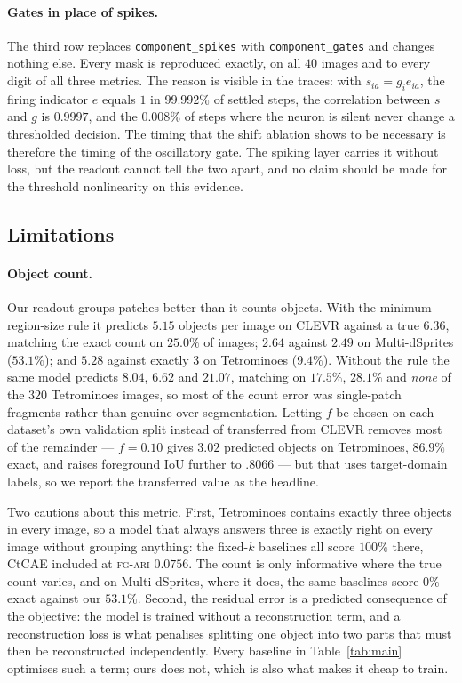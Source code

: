 \paragraph{Gates in place of spikes.}
The third row replaces \texttt{component\_spikes} with \texttt{component\_gates} and changes
nothing else. Every mask is reproduced exactly, on all $40$ images and to every digit of all
three metrics. The reason is visible in the traces: with $s_{ia}=g_ie_{ia}$, the firing
indicator $e$ equals $1$ in $99.992\%$ of settled steps, the correlation between $s$ and $g$ is
$0.9997$, and the $0.008\%$ of steps where the neuron is silent never change a thresholded
decision. The timing that the shift ablation shows to be necessary is therefore the timing of
the oscillatory gate. The spiking layer carries it without loss, but the readout cannot tell
the two apart, and no claim should be made for the threshold nonlinearity on this evidence.

\subsection{Limitations}
\label{sec:limitations}

\paragraph{Object count.}
Our readout groups patches better than it counts objects. With the minimum-region-size rule it
predicts $5.15$ objects per image on CLEVR against a true $6.36$, matching the exact count on
$25.0\%$ of images; $2.64$ against $2.49$ on Multi-dSprites ($53.1\%$); and $5.28$ against exactly
$3$ on Tetrominoes ($9.4\%$). Without the rule the same model predicts $8.04$, $6.62$ and $21.07$,
matching on $17.5\%$, $28.1\%$ and \emph{none} of the $320$ Tetrominoes images, so most of the
count error was single-patch fragments rather than genuine over-segmentation. Letting $f$ be
chosen on each dataset's own validation split instead of transferred from CLEVR removes most of
the remainder --- $f=0.10$ gives $3.02$ predicted objects on Tetrominoes, $86.9\%$ exact, and
raises foreground IoU further to $.8066$ --- but that uses target-domain labels, so we report the
transferred value as the headline.

Two cautions about this metric. First, Tetrominoes contains exactly three objects in every image,
so a model that always answers three is exactly right on every image without grouping anything:
the fixed-$k$ baselines all score $100\%$ there, CtCAE included at \textsc{fg-ari} $0.0756$. The
count is only informative where the true count varies, and on Multi-dSprites, where it does, the
same baselines score $0\%$ exact against our $53.1\%$. Second, the residual error is a predicted
consequence of the objective: the model is trained without a reconstruction term, and a
reconstruction loss is what penalises splitting one object into two parts that must then be
reconstructed independently. Every baseline in Table~\ref{tab:main} optimises such a term; ours
does not, which is also what makes it cheap to train.

